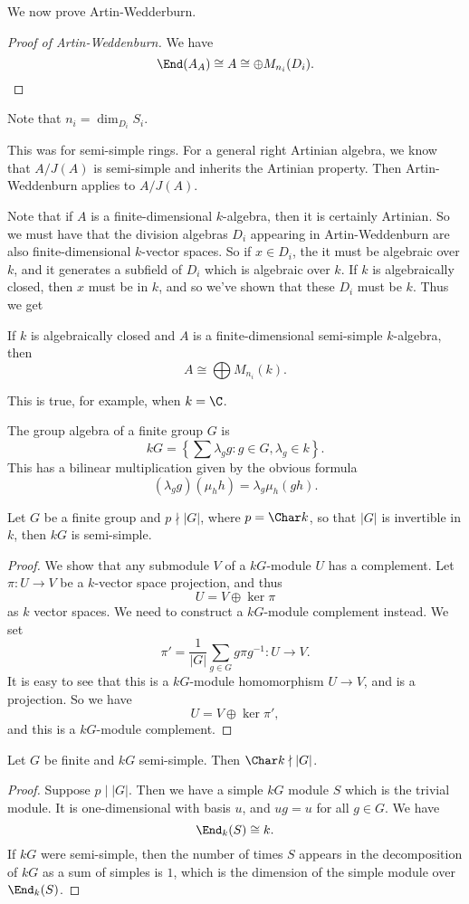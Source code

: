 \documentclass[a4paper]{article}
\begin{document}
We now prove Artin-Wedderburn.
\begin{proof}[Proof of Artin-Weddenburn]
  We have
  \[
    \End(A_A) \cong A \cong \oplus M_{n_i}(D_i).
  \]
\end{proof}
Note that $n_i = \dim_{D_i} S_i$.

This was for semi-simple rings. For a general right Artinian algebra, we know that $A/J(A)$ is semi-simple and inherits the Artinian property. Then Artin-Weddenburn applies to $A/J(A)$.

Note that if $A$ is a finite-dimensional $k$-algebra, then it is certainly Artinian. So we must have that the division algebras $D_i$ appearing in Artin-Weddenburn are also finite-dimensional $k$-vector spaces. So if $x \in D_i$, the it must be algebraic over $k$, and it generates a subfield of $D_i$ which is algebraic over $k$. If $k$ is algebraically closed, then $x$ must be in $k$, and so we've shown that these $D_i$ must be $k$. Thus we get

\begin{cor}
  If $k$ is algebraically closed and $A$ is a finite-dimensional semi-simple $k$-algebra, then
  \[
    A \cong \bigoplus M_{n_i}(k).
  \]
\end{cor}
This is true, for example, when $k = \C$.

The group algebra of a finite group $G$ is
\[
  kG = \left\{\sum \lambda_g g: g \in G, \lambda_g \in k\right\}.
\]
This has a bilinear multiplication given by the obvious formula
\[
  (\lambda_g g) (\mu_h h) = \lambda_g \mu_h (gh).
\]
\begin{thm}
  Let $G$ be a finite group and $p \nmid |G|$, where $p = \Char k$, so that $|G|$ is invertible in $k$, then $kG$ is semi-simple.
\end{thm}

\begin{proof}
  We show that any submodule $V$ of a $kG$-module $U$ has a complement. Let $\pi: U \to V$ be a $k$-vector space projection, and thus
  \[
    U = V \oplus \ker \pi
  \]
  as $k$ vector spaces. We need to construct a $kG$-module complement instead. We set
  \[
    \pi' = \frac{1}{|G|} \sum_{g \in G} g\pi g^{-1}: U \to V.
  \]
  It is easy to see that this is a $kG$-module homomorphism $U \to V$, and is a projection. So we have
  \[
    U = V \oplus \ker \pi',
  \]
  and this is a $kG$-module complement.
\end{proof}

\begin{thm}
  Let $G$ be finite and $kG$ semi-simple. Then $\Char k \nmid |G|$.
\end{thm}

\begin{proof}
  Suppose $p \mid |G|$. Then we have a simple $kG$ module $S$ which is the trivial module. It is one-dimensional with basis $u$, and $ug = u$ for all $g \in G$. We have
  \[
    \End_k(S) \cong k.
  \]
  If $kG$ were semi-simple, then the number of times $S$ appears in the decomposition of $kG$ as a sum of simples is $1$, which is the dimension of the simple module over $\End_k(S)$.
\end{proof}
\printindex
\end{document}
